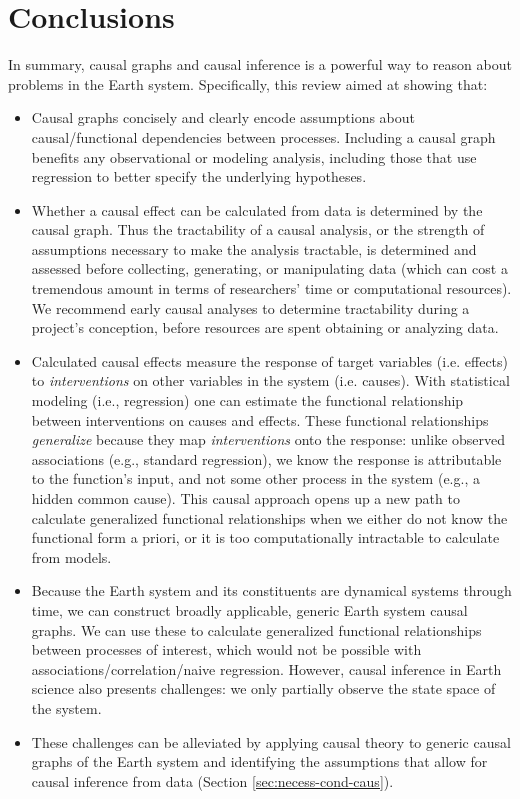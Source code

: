 \documentclass[12pt]{article}
\begin{document}
\section{Conclusions}

In summary, causal graphs and causal inference is a powerful way to reason about problems in the Earth system. Specifically, this review aimed at showing that:

\begin{itemize}
\item Causal graphs concisely and clearly encode assumptions about
  causal/functional dependencies between processes. Including a causal
  graph benefits any observational or modeling analysis, including
  those that use regression to better specify the underlying hypotheses.
\item Whether a causal effect can be calculated from data is
  determined by the causal graph. Thus the tractability of a causal
  analysis, or the strength of assumptions necessary to make the
  analysis tractable, is determined and assessed before collecting,
  generating, or manipulating data (which can cost a tremendous amount
  in terms of researchers' time or computational resources). We
  recommend early causal analyses to determine tractability during a
  project's conception, before resources are spent obtaining or
  analyzing data.
\item Calculated causal effects measure the response of target
  variables (i.e. effects) to \textit{interventions} on other
  variables in the system (i.e. causes). With statistical modeling
  (i.e., regression) one can estimate the functional relationship
  between interventions on causes and effects.  These functional
  relationships \textit{generalize} because they map
  \textit{interventions} onto the response: unlike observed
  associations (e.g., standard regression), we know the response is
  attributable to the function's input, and not some other process in
  the system (e.g., a hidden common cause). This causal approach opens
  up a new path to calculate generalized functional relationships when
  we either do not know the functional form a priori, or it is too
  computationally intractable to calculate from models.
\item Because the Earth system and its constituents are dynamical systems through time, we can construct broadly applicable, generic Earth system
  causal graphs. We can use these to calculate generalized functional
  relationships between processes of interest, which would not be
  possible with associations/correlation/naive regression. However,
  causal inference in Earth science also presents challenges: we only
  partially observe the state space of the system.
\item These challenges can be alleviated by applying causal theory to
  generic causal graphs of the Earth system and identifying the
  assumptions that allow for causal inference from data (Section
  \ref{sec:necess-cond-caus}).
\end{itemize}
\end{document}
